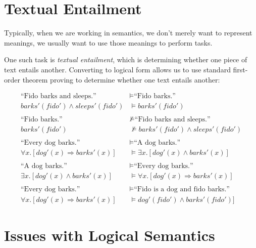 \documentclass[11pt,letterpaper]{article}
\begin{document}
\section{Textual Entailment}

Typically, when we are working in semantics, we don't merely want to represent meanings, we usually want to use those meanings to perform tasks.  

One such task is \textit{textual entailment}, which is determining whether one piece of text entails another.  Converting to logical form allows us to use standard first-order theorem proving to determine whether one text entails another:

\begin{align*}
  \text{``Fido barks and sleeps.''} &\vDash \text{``Fido barks.''} \\
  \textit{barks}'(\textit{fido}') \land \textit{sleeps}'(\textit{fido}') &\vDash \textit{barks}'(\textit{fido}')
  \\\\
  \text{``Fido barks.''} &\not\vDash \text{``Fido barks and sleeps.''} \\
  \textit{barks}'(\textit{fido}') &\not\vDash \textit{barks}'(\textit{fido}') \land \textit{sleeps}'(\textit{fido}')
  \\\\
  \text{``Every dog barks.''} &\vDash \text{``A dog barks.''} \\
  \forall x.[\textit{dog}'(x) \Rightarrow \textit{barks}'(x)] &\vDash \exists x.[\textit{dog}'(x) \land \textit{barks}'(x)]
  \\\\
  \text{``A dog barks.''} &\vDash \text{``Every dog barks.''} \\
  \exists x.[\textit{dog}'(x) \land \textit{barks}'(x)] &\vDash \forall x.[\textit{dog}'(x) \Rightarrow \textit{barks}'(x)]
  \\\\
  \text{``Every dog barks.''} &\vDash \text{``Fido is a dog and fido barks.''} \\
  \forall x.[\textit{dog}'(x) \Rightarrow \textit{barks}'(x)] &\vDash 
  \textit{dog}'(\textit{fido}') \land \textit{barks}'(\textit{fido}')]
\end{align*}


\section{Issues with Logical Semantics}
\end{document}
